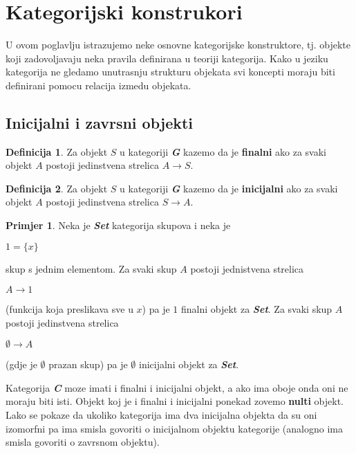 \documentclass[11pt]{article}
\newcommand{\category}[1]{\textbf{\emph{#1}}}
\theoremstyle{definition}
\newtheorem{definition}{Definicija}
\newtheorem{primjer}{Primjer}
\begin{document}
  \section{Kategorijski konstrukori}
  U ovom poglavlju istrazujemo neke osnovne kategorijske
  konstruktore, tj. objekte koji zadovoljavaju neka pravila definirana u teoriji
  kategorija. Kako u jeziku kategorija ne gledamo unutrasnju strukturu objekata
  svi koncepti moraju biti definirani pomocu relacija izmedu objekata.
  \subsection{Inicijalni i zavrsni objekti}
  \begin{definition}
    Za objekt $S$ u kategoriji \category{G} kazemo da je \textbf{finalni} ako za svaki
    objekt $A$ postoji jedinstvena strelica $A \xrightarrow{} S$.
  \end{definition}
  \begin{definition}
    Za objekt $S$ u kategoriji \category{G} kazemo da je \textbf{inicijalni} ako za svaki
    objekt $A$ postoji jedinstvena strelica $S \xrightarrow{} A$.
  \end{definition}
  \begin{primjer}
    Neka je \category{Set} kategorija skupova i neka je 
    \begin{center}
      $1 = \{x\}$
    \end{center}
    skup s jednim elementom. Za svaki skup $A$ postoji jednistvena strelica
    \begin{center}
      $A \xrightarrow{} 1$
    \end{center}
    (funkcija koja preslikava sve u $x$) pa je $1$ finalni objekt za
    \category{Set}.
    Za svaki skup $A$ postoji jedinstvena strelica
    \begin{center}
      $\emptyset \xrightarrow{} A$
    \end{center}
    (gdje je $\emptyset$ prazan skup) pa je $\emptyset$ inicijalni objekt za
    \category{Set}.
  \end{primjer}
  Kategorija \category{C} moze imati i finalni i inicijalni objekt, a ako ima
  oboje onda oni ne moraju biti isti. Objekt koj je i finalni i inicijalni ponekad
  zovemo \textbf{nulti} objekt. Lako se pokaze da ukoliko kategorija ima dva inicijalna
  objekta da su oni izomorfni pa ima smisla govoriti o inicijalnom objektu
  kategorije (analogno ima smisla govoriti o zavrsnom objektu).
\end{document}
